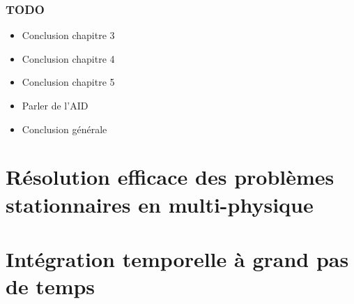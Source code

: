 



\makeflyleaf
{}

\tableofcontents
{}



\section*{TODO}
\begin{itemize}
  \item Conclusion chapitre 3
  \item Conclusion chapitre 4
  \item Conclusion chapitre 5
  \item Parler de l'AID
  \item Conclusion générale
\end{itemize}


\part{Résolution efficace des problèmes stationnaires en multi-physique}

  

  

  

\part{Intégration temporelle à grand pas de temps}

    

    





